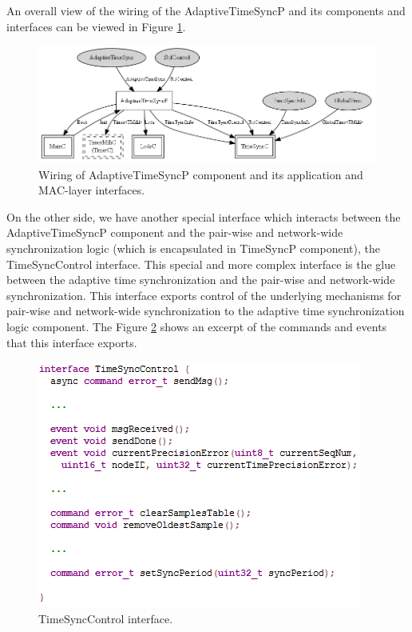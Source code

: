 An overall view of the wiring of the AdaptiveTimeSyncP and its components and interfaces can be viewed in Figure \ref{compwiring}.

\begin{figure}[!htb]
\begin{center}
\includegraphics[scale=0.4]{./images/30-ttsp-interface_wiring.png}
\end{center}
\caption{Wiring of AdaptiveTimeSyncP component and its application and MAC-layer interfaces.}
\label{compwiring}
\end{figure}

On the other side, we have another special interface which interacts between the AdaptiveTimeSyncP component and the pair-wise and network-wide synchronization logic (which is encapsulated in TimeSyncP component), the TimeSyncControl interface. This special and more complex interface is the glue between the adaptive time synchronization and the pair-wise and network-wide synchronization. This interface exports control of the underlying mechanisms for pair-wise and network-wide synchronization to the adaptive time synchronization logic component. The Figure \ref{timesynccontrol} shows an excerpt of the commands and events that this interface exports.

\begin{figure}[!htb]
\begin{center}
\includegraphics[scale=0.5]{./images/36-ttsp-code_interfaces4.png}
\end{center}
\caption{TimeSyncControl interface.}
\label{timesynccontrol}
\end{figure}

